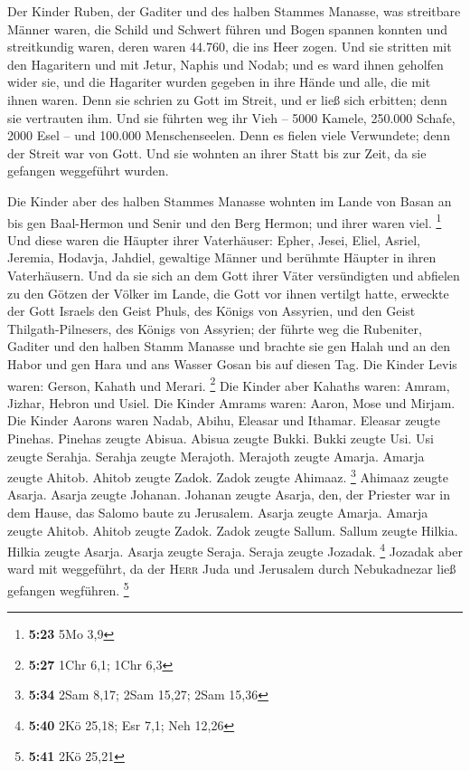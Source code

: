  Der Kinder Ruben, der Gaditer und des halben Stammes
Manasse, was streitbare Männer waren, die Schild und Schwert führen und
Bogen spannen konnten und streitkundig waren, deren waren 44.760, die
ins Heer zogen.  Und sie stritten mit den Hagaritern und
mit Jetur, Naphis und Nodab;  und es ward ihnen geholfen
wider sie, und die Hagariter wurden gegeben in ihre Hände und alle, die
mit ihnen waren. Denn sie schrien zu Gott im Streit, und er ließ sich
erbitten; denn sie vertrauten ihm.  Und sie führten weg
ihr Vieh -- 5000 Kamele, 250.000 Schafe, 2000 Esel -- und 100.000
Menschenseelen.  Denn es fielen viele Verwundete; denn
der Streit war von Gott. Und sie wohnten an ihrer Statt bis zur Zeit, da
sie gefangen weggeführt wurden.

 Die Kinder aber des halben Stammes Manasse wohnten im
Lande von Basan an bis gen Baal-Hermon und Senir und den Berg Hermon;
und ihrer waren viel. \footnote{\textbf{5:23} 5Mo 3,9} 
Und diese waren die Häupter ihrer Vaterhäuser: Epher, Jesei, Eliel,
Asriel, Jeremia, Hodavja, Jahdiel, gewaltige Männer und berühmte Häupter
in ihren Vaterhäusern.  Und da sie sich an dem Gott ihrer
Väter versündigten und abfielen zu den Götzen der Völker im Lande, die
Gott vor ihnen vertilgt hatte,  erweckte der Gott Israels
den Geist Phuls, des Königs von Assyrien, und den Geist
Thilgath-Pilnesers, des Königs von Assyrien; der führte weg die
Rubeniter, Gaditer und den halben Stamm Manasse und brachte sie gen
Halah und an den Habor und gen Hara und ans Wasser Gosan bis auf diesen
Tag.  Die Kinder Levis waren: Gerson, Kahath und Merari.
\footnote{\textbf{5:27} 1Chr 6,1; 1Chr 6,3}  Die Kinder
aber Kahaths waren: Amram, Jizhar, Hebron und Usiel.  Die
Kinder Amrams waren: Aaron, Mose und Mirjam. Die Kinder Aarons waren
Nadab, Abihu, Eleasar und Ithamar.  Eleasar zeugte
Pinehas. Pinehas zeugte Abisua.  Abisua zeugte Bukki.
Bukki zeugte Usi.  Usi zeugte Serahja. Serahja zeugte
Merajoth.  Merajoth zeugte Amarja. Amarja zeugte Ahitob.
 Ahitob zeugte Zadok. Zadok zeugte Ahimaaz. \footnote{\textbf{5:34}
  2Sam 8,17; 2Sam 15,27; 2Sam 15,36}  Ahimaaz zeugte
Asarja. Asarja zeugte Johanan.  Johanan zeugte Asarja,
den, der Priester war in dem Hause, das Salomo baute zu Jerusalem.
 Asarja zeugte Amarja. Amarja zeugte Ahitob.
 Ahitob zeugte Zadok. Zadok zeugte Sallum.
 Sallum zeugte Hilkia. Hilkia zeugte Asarja.
 Asarja zeugte Seraja. Seraja zeugte Jozadak. \footnote{\textbf{5:40}
  2Kö 25,18; Esr 7,1; Neh 12,26}  Jozadak aber ward mit
weggeführt, da der \textsc{Herr} Juda und Jerusalem durch Nebukadnezar
ließ gefangen wegführen. \footnote{\textbf{5:41} 2Kö 25,21}

